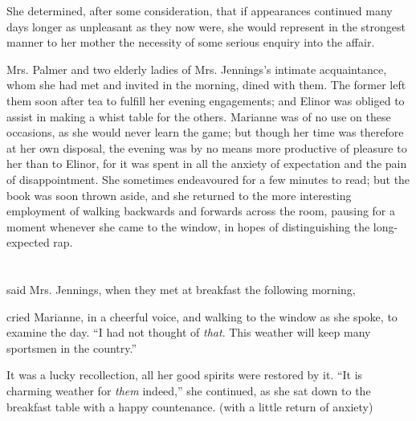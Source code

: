 She determined, after some consideration, that if appearances continued many days longer as unpleasant as they now were, she would represent in the strongest manner to her mother the necessity of some serious enquiry into the affair.

Mrs. Palmer and two elderly ladies of Mrs. Jennings's intimate acquaintance, whom she had met and invited in the morning, dined with them. The former left them soon after tea to fulfill her evening engagements; and Elinor was obliged to assist in making a whist table for the others. Marianne was of no use on these occasions, as she would never learn the game; but though her time was therefore at her own disposal, the evening was by no means more productive of pleasure to her than to Elinor, for it was spent in all the anxiety of expectation and the pain of disappointment. She sometimes endeavoured for a few minutes to read; but the book was soon thrown aside, and she returned to the more interesting employment of walking backwards and forwards across the room, pausing for a moment whenever she came to the window, in hopes of distinguishing the long-expected rap.

\chapter{} %

 said Mrs. Jennings, when they met at breakfast the following morning, 

 cried Marianne, in a cheerful voice, and walking to the window as she spoke, to examine the day. “I had not thought of {\em that}. This weather will keep many sportsmen in the country.”

It was a lucky recollection, all her good spirits were restored by it. “It is charming weather for {\em them} indeed,” she continued, as she sat down to the breakfast table with a happy countenance.  (with a little return of anxiety) 

